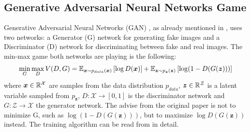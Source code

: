 
\subsection{Generative Adversarial Neural Networks Game}\label{sec:nn_theory_gan}
\thesisStateNew
Generative Adversarial Neural Networks (GAN) \cite{Goodfellow2014}, as already mentioned in , uses two networks: a Generator (G) network for generating fake images and a Discriminator (D) network for discriminating between fake and real images.
The min-max game both networks are playing is the following:
\begin{equation}\label{eq:nn_theory_gan}
  \underset{G}{\min} \, \underset{D}{\max} \, V(D, G) = \mathbb{E}_{\bm{x} \sim p_{data}(\bm{x})}\left[ \log D(\bm{x}) \right] + 
    \mathbb{E}_{\bm{z} \sim p_{\bm{z}}(\bm{z})}\left[ \log (1 - D(G(\bm{z}))) \right]
\end{equation}
where $\bm{x} \in \mathbb{R}^\mathcal{X}$ are samples from the data distribution $p_{data}$, $\bm{z} \in \mathbb{R}^\mathcal{Z}$ is a latent variable sampled from $p_{\bm{z}}$, $D: \mathcal{X} \to [0, 1]$ is the discriminator network and $G: \mathcal{Z} \to \mathcal{X}$ the generator network.
The advise from the original paper is not to minimize G, such as $\log (1 - D(G(\bm{z})))$, but to maximize $\log D(G(\bm{z}))$ instead.
The training algorithm can be read from \cite{Goodfellow2014} in detail.